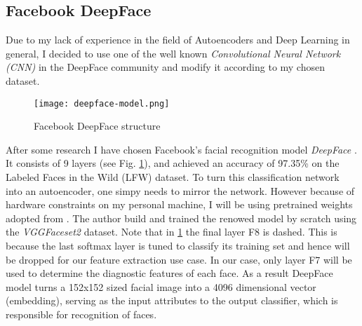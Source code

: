 \subsection{Facebook DeepFace} \label{sec:deepFace}
Due to my lack of experience in the field of Autoencoders and Deep Learning in
general, I decided to use one of the well known \textit{Convolutional Neural
Network (CNN)} in the DeepFace community and modify it according to my
chosen dataset.

\begin{figure}[ht]
  \centering
  \texttt{[image: deepface-model.png]}
  \caption{Facebook DeepFace structure}
  \label{dfstructure}
\end{figure}

After some research I have chosen Facebook's facial recognition model
\textit{DeepFace} \cite{taigman2014deepface}. It consists of 9 layers (see Fig.
\ref{dfstructure}), and achieved an accuracy of 97.35\% on the Labeled Faces in
the Wild (LFW) dataset. To turn this classification network into an autoencoder,
one simpy needs to mirror the network. However because of hardware constraints
on my personal machine, I will be using pretrained weights adopted from
\cite{serengil2017tensorflow101}. The author build and trained the renowed
model by scratch using the \textit{VGGFaceset2} dataset. Note that in
\ref{dfstructure} the final layer F8 is dashed. This is because the last softmax
layer is tuned to classify its training set and hence will be dropped for our
feature extraction use case. In our case, only layer F7 will be used to
determine the diagnostic features of each face. As a result DeepFace model turns
a 152x152 sized facial image into a 4096 dimensional vector (embedding), serving
as the input attributes to the output classifier, which is responsible for
recognition of faces.

